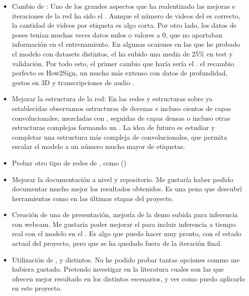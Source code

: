 \begin{itemize}
  \item Cambio de : Uno de los grandes aspectos que ha realentizado las mejoras e iteraciones de la red ha sido el . Aunque el número de videos del  es correcto, la cantidad de videos por etiqueta es algo corta. Por otro lado, los datos de poses tenían muchas veces datos nulos o valores a 0, que no aportaban información en el entrenamiento. En algunas ocaiones en las que he probado el modelo con datasets distintos, el  ha subido una media de 25\% en test y validación. Por todo esto, el primer cambio que haría sería el . el recambio perfecto es How2Sign, un  mucho más extenso con datos de profundidad, gestos en 3D y transcripciones de audio .

  \item Mejorar la estructura de la red: En las redes y estructuras sobre  ya establecidas observamos estructuras de decenas e incluso cientos de capas convolucionales, mezcladas con , seguidas de capas densas o incluso otras estructuras complejas formando un . La idea de futuro es estudiar y completar una estructura más compleja de convolucionales, que permita escalar el modelo a un número mucho mayor de etiquetas.

  \item Probar otro tipo de redes de , como  ()

  \item Mejorar la documentación a nivel  y repositorio. Me gustaría haber podido documentar mucho mejor los resultados obtenidos. Es una pena que descubrí herramientas como  en las últimas etapas del proyecto.

  \item Creación de una  de presentación, mejoría de la demo subida para inferencia con webcam. Me gustaría poder mejorar el  para incluir inferencia a tiempo real con el modelo en el . Es algo que puedo hacer muy pronto, con el estado actual del proyecto, pero que se ha quedado fuera de la iteración final.

  \item Utilización de ,  y  distintos. No he podido probar tantas opciones commo me hubiera gustado. Pretendo investigar en la literatura cuales son las que ofrecen mejor resultado en los distintos escenarios, y ver como puedo aplicarlo en este proyecto.


\end{itemize}

